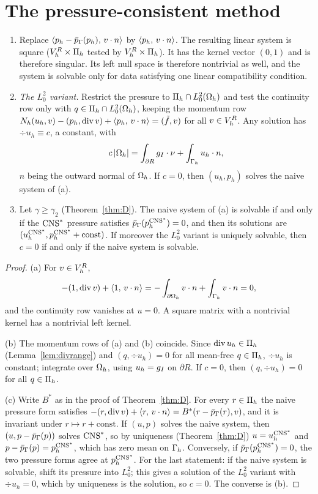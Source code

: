 \section{The pressure-consistent method}\label{sec:consistent}

\begin{proposition}\label{prop:singular}
\begin{enumerate}[label=(\alph*)]
\item Replace $\langle p_h-\bar p_{\Gamma}(p_h),\, v\cdot n\rangle$ by $\langle p_h,\, v\cdot n\rangle$. The resulting linear system is square ($V_h^R\times\Pi_h$ tested by $V_h^R\times\Pi_h$). It has the kernel vector $(0,1)$ and is therefore singular. Its left null space is therefore nontrivial as well, and the system is solvable only for data satisfying one linear compatibility condition.
\item \emph{The $L^2_0$ variant.} Restrict the pressure to $\Pi_h\cap L^2_0(\Omega_h)$ and test the continuity row only with $q\in\Pi_h\cap L^2_0(\Omega_h)$, keeping the momentum row $N_h(u_h,v)-(p_h,\operatorname{div} v)+\langle p_h,\, v\cdot n\rangle=(\tilde f,v)$ for all $v\in V_h^R$. Any solution has $\div u_h\equiv c$, a constant, with
\[
c\,|\Omega_h|=\int_{\partial R}g_I\cdot\nu+\int_{\Gamma_h}u_h\cdot n ,
\]
$n$ being the outward normal of $\Omega_h$. If $c=0$, then $(u_h,p_h)$ solves the naive system of (a).
\item Let $\gamma\ge\gamma_2$ (Theorem~\ref{thm:D}). The naive system of (a) is solvable if and only if the $\mathrm{CNS}^\ast$ pressure satisfies $\bar p_{\Gamma}(p_h^{\mathrm{CNS}^\ast})=0$, and then its solutions are $(u_h^{\mathrm{CNS}^\ast},p_h^{\mathrm{CNS}^\ast}+\text{const})$. If moreover the $L^2_0$ variant is uniquely solvable, then $c=0$ if and only if the naive system is solvable.
\end{enumerate}
\end{proposition}

\begin{proof}
(a) For $v\in V_h^R$,
\[
-(1,\operatorname{div} v)+\langle 1,\, v\cdot n\rangle=-\int_{\partial\Omega_h}v\cdot n+\int_{\Gamma_h}v\cdot n=0 ,
\]
and the continuity row vanishes at $u=0$. A square matrix with a nontrivial kernel has a nontrivial left kernel.

(b) The momentum rows of (a) and (b) coincide. Since $\operatorname{div} u_h\in\Pi_h$ (Lemma~\ref{lem:divrange}) and $(q,\div u_h)=0$ for all mean-free $q\in\Pi_h$, $\div u_h$ is constant; integrate over $\Omega_h$, using $u_h=g_I$ on $\partial R$. If $c=0$, then $(q,\div u_h)=0$ for all $q\in\Pi_h$.

(c) Write $B^\ast$ as in the proof of Theorem~\ref{thm:D}. For every $r\in\Pi_h$ the naive pressure form satisfies $-(r,\operatorname{div} v)+\langle r,\, v\cdot n\rangle=B^\ast(r-\bar p_{\Gamma}(r),v)$, and it is invariant under $r\mapsto r+\text{const}$. If $(u,p)$ solves the naive system, then $(u,p-\bar p_{\Gamma}(p))$ solves $\mathrm{CNS}^\ast$, so by uniqueness (Theorem~\ref{thm:D}) $u=u_h^{\mathrm{CNS}^\ast}$ and $p-\bar p_{\Gamma}(p)=p_h^{\mathrm{CNS}^\ast}$, which has zero mean on $\Gamma_h$. Conversely, if $\bar p_{\Gamma}(p_h^{\mathrm{CNS}^\ast})=0$, the two pressure forms agree at $p_h^{\mathrm{CNS}^\ast}$. For the last statement: if the naive system is solvable, shift its pressure into $L^2_0$; this gives a solution of the $L^2_0$ variant with $\div u_h=0$, which by uniqueness is the solution, so $c=0$. The converse is (b).
\end{proof}

